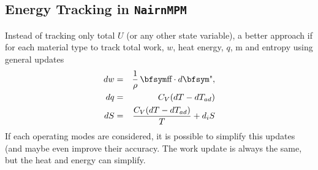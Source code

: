 \documentclass[11pt]{article}
\begin{document}
\subsection{Energy Tracking in {\tt NairnMPM}}

Instead of tracking only total $U$ (or any other state variable), a better approach if for each material type to track total work, $w$,  heat energy, $q$, m and entropy using general updates
\begin{eqnarray}
           dw & = & {1\over \rho}\thinspace \st\cdot d\et, \\
           dq & = & C_V (dT - dT_{ad})  \\
           dS & = & {C_V (dT - dT_{ad})\over T} + d_iS
\end{eqnarray}
If each operating modes are considered, it is possible to simplify this updates (and maybe even improve their accuracy. The work update is always the same, but the heat and energy can simplify.
\end{document}
